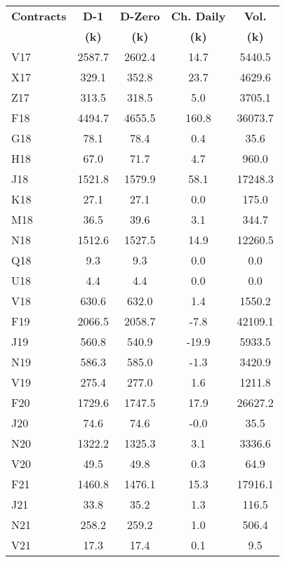 \documentclass[article,crop=false]{standalone}%
\begin{document}
%
\normalsize%
\setlength{\tabcolsep}{0.15cm}%
\begin{tabular}[h]{l | c c c c}%
\hline%
\rowcolor{white}%
\textbf{Contracts}&\textbf{D{-}1}&\textbf{D{-}Zero}&\textbf{Ch. Daily}&\textbf{Vol.}\\%
\rowcolor{white}%
\textbf{}&\textbf{(k)}&\textbf{(k)}&\textbf{(k)}&\textbf{(k)}\\%
\hline%
\rowcolor{lightgray}%
V17&2587.7&2602.4&14.7&5440.5\\%
\rowcolor{white}%
X17&329.1&352.8&23.7&4629.6\\%
\rowcolor{lightgray}%
Z17&313.5&318.5&5.0&3705.1\\%
\rowcolor{white}%
F18&4494.7&4655.5&160.8&36073.7\\%
\rowcolor{lightgray}%
G18&78.1&78.4&0.4&35.6\\%
\rowcolor{white}%
H18&67.0&71.7&4.7&960.0\\%
\rowcolor{lightgray}%
J18&1521.8&1579.9&58.1&17248.3\\%
\rowcolor{white}%
K18&27.1&27.1&0.0&175.0\\%
\rowcolor{lightgray}%
M18&36.5&39.6&3.1&344.7\\%
\rowcolor{white}%
N18&1512.6&1527.5&14.9&12260.5\\%
\rowcolor{lightgray}%
Q18&9.3&9.3&0.0&0.0\\%
\rowcolor{white}%
U18&4.4&4.4&0.0&0.0\\%
\rowcolor{lightgray}%
V18&630.6&632.0&1.4&1550.2\\%
\rowcolor{white}%
F19&2066.5&2058.7&{-}7.8&42109.1\\%
\rowcolor{lightgray}%
J19&560.8&540.9&{-}19.9&5933.5\\%
\rowcolor{white}%
N19&586.3&585.0&{-}1.3&3420.9\\%
\rowcolor{lightgray}%
V19&275.4&277.0&1.6&1211.8\\%
\rowcolor{white}%
F20&1729.6&1747.5&17.9&26627.2\\%
\rowcolor{lightgray}%
J20&74.6&74.6&{-}0.0&35.5\\%
\rowcolor{white}%
N20&1322.2&1325.3&3.1&3336.6\\%
\rowcolor{lightgray}%
V20&49.5&49.8&0.3&64.9\\%
\rowcolor{white}%
F21&1460.8&1476.1&15.3&17916.1\\%
\rowcolor{lightgray}%
J21&33.8&35.2&1.3&116.5\\%
\rowcolor{white}%
N21&258.2&259.2&1.0&506.4\\%
\rowcolor{lightgray}%
V21&17.3&17.4&0.1&9.5\\%

\end{tabular}
\end{document}
